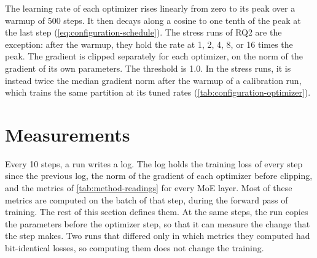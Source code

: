 The learning rate of each optimizer rises linearly from zero to its peak over a warmup of 500 steps. It then decays along a cosine to one tenth of the peak at the last step (\cref{eq:configuration-schedule}). The stress runs of RQ2 are the exception: after the warmup, they hold the rate at 1, 2, 4, 8, or 16 times the peak. The gradient is clipped separately for each optimizer, on the norm of the gradient of its own parameters. The threshold is 1.0. In the stress runs, it is instead twice the median gradient norm after the warmup of a calibration run, which trains the same partition at its tuned rates (\cref{tab:configuration-optimizer}).

\section{Measurements}
\label{sec:method-measurements}
Every 10 steps, a run writes a log. The log holds the training loss of every step since the previous log, the norm of the gradient of each optimizer before clipping, and the metrics of \cref{tab:method-readings} for every MoE layer. Most of these metrics are computed on the batch of that step, during the forward pass of training. The rest of this section defines them. At the same steps, the run copies the parameters before the optimizer step, so that it can measure the change that the step makes. Two runs that differed only in which metrics they computed had bit-identical losses, so computing them does not change the training.

